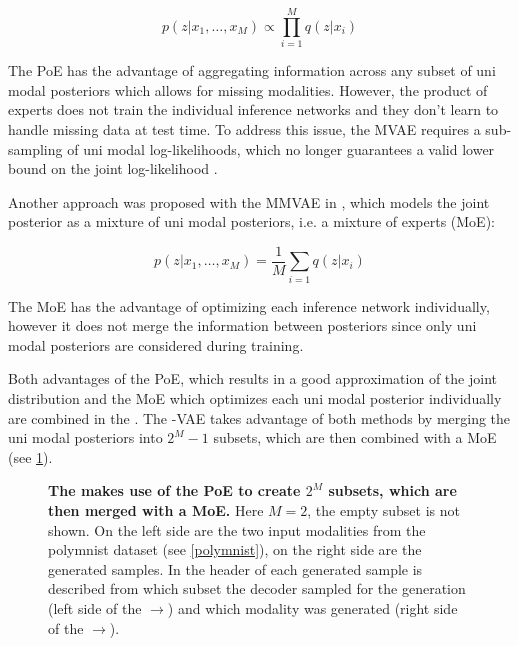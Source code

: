 \begin{equation}
    p(z|x_1,\ldots,x_M) \propto \prod ^M _{i=1} q(z|x_i)
\end{equation}

The PoE has the advantage of aggregating information across any subset of uni modal posteriors which allows for missing modalities.
However, the product of experts does not train the individual inference networks and they don't learn to handle missing data at test time.
To address this issue, the MVAE requires a sub-sampling of uni modal log-likelihoods, which no longer guarantees a valid lower bound on the joint log-likelihood \parencite{wu_multimodal_2019}.

Another approach was proposed with the MMVAE in \cite{shi2019variational}, which models the joint posterior as a mixture of uni modal posteriors, i.e. a mixture of experts (MoE):

\begin{equation}
    p(z|x_1,\ldots,x_M) = \frac{1}{M} \sum _{i=1} q(z|x_i)
\end{equation}

The MoE has the advantage of optimizing each inference network individually, however it does not merge the information between posteriors since only uni modal posteriors are considered during training.

Both advantages of the PoE, which results in a good approximation of the joint distribution and the MoE which optimizes each uni modal posterior individually are combined in the  \parencite{thomas_gener-ELBO}.
The -VAE takes advantage of both methods by merging the uni modal posteriors into $2^M - 1$ subsets, which are then combined with a MoE (see \cref{mopoeGraph}).

\begin{figure}[h!]
    \centering
    \caption{\textbf{The  makes use of the PoE to create $2^M$ subsets, which are then merged with a MoE.} Here $M=2$, the empty subset is not shown. On the left side are the two input modalities from the polymnist dataset (see \cref{polymnist}), on the right side are the generated samples. In the header of each generated sample is described from which subset the decoder sampled for the generation (left side of the $\rightarrow$) and which modality was generated (right side of the $\rightarrow$).}
    \label{mopoeGraph}
\end{figure}

